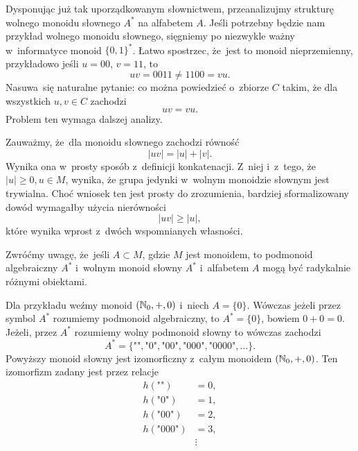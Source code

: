 \documentclass[a4paper,11pt]{article}
\begin{document}
\start {} Dysponując już tak uporządkowanym słownictwem,
przeanalizujmy strukturę wolnego monoidu słownego $A^{ * }$ na
alfabetem $A$. Jeśli potrzebny będzie nam przykład wolnego monoidu
słownego, sięgniemy po niezwykle ważny w~informatyce monoid
$\{ 0, 1 \}^{ * }$. Łatwo spostrzec, że~jest to monoid nieprzemienny,
przykładowo jeśli $u = 00$, $v = 11$, to
\begin{equation}
  \label{eq:Forys-Forys-07}
  u v = 0011 \neq 1100 = vu.
\end{equation}
Nasuwa~się naturalne pytanie: co można powiedzieć o~zbiorze $C$ takim,
że dla wszystkich $u, v \in C$ zachodzi
\begin{equation}
  \label{eq:Forys-Forys-08}
  uv = vu.
\end{equation}
Problem ten wymaga dalszej analizy.

Zauważmy, że~dla monoidu słownego zachodzi równość
\begin{equation}
  \label{eq:Forys-Forys-09}
  | u v | = | u | + | v |.
\end{equation}
Wynika ona w~prosty sposób z~definicji konkatenacji. Z~niej i~z~tego,
że~$| u | \geq 0, u \in M$, wynika, że grupa jedynki w~wolnym
monoidzie słownym jest trywialna. Choć wniosek ten jest prosty do
zrozumienia, bardziej sformalizowany dowód wymagałby użycia
nierówności
\begin{equation}
  \label{eq:Forys-Forys-10}
  | u v | \geq | u |,
\end{equation}
które wynika wprost z~dwóch wspomnianych własności.

\vspace{\spaceFour}





 Zwróćmy uwagę, że~jeśli $A \subset M$, gdzie $M$ jest monoidem, to
podmonoid algebraiczny $A^{ * }$ i~wolnym monoid słowny $A^{ * }$
i~alfabetem $A$ mogą być radykalnie różnymi obiektami.

Dla przykładu weźmy monoid $( \mathbb{N}_{ 0 }, +, 0)$ i~niech $A = \{ 0 \}$. Wówczas
jeżeli przez symbol $A^{ * }$ rozumiemy podmonoid algebraiczny, to $A^{ * } =
\{ 0 \}$, bowiem $0 + 0 = 0$. Jeżeli, przez $A^{ * }$ rozumiemy wolny podmonoid
słowny to wówczas zachodzi
\begin{equation}
  \label{eq:Forys-Forys-11}
  A^{ * } = \{ \texttt{""}, \texttt{"} 0 \texttt{"},
  \texttt{"} 00 \texttt{"}, \texttt{"} 000 \texttt{"},
  \texttt{"} 0000 \texttt{"}, \ldots \}.
\end{equation}
Powyższy monoid słowny jest izomorficzny z~całym monoidem
$( \mathbb{N}_{ 0 }, +, 0)$. Ten izomorfizm zadany jest przez relacje
\begin{equation}
  \label{eq:Forys-Forys-12}
  \begin{split}
    h( \texttt{""} ) &= 0, \\
    h( \texttt{"} 0 \texttt{"} ) &= 1, \\
    h( \texttt{"} 0 0 \texttt{"} ) &= 2, \\
    h( \texttt{"} 0 0 0 \texttt{"} ) &= 3, \\
                     &\vdots
  \end{split}
\end{equation}
\end{document}
